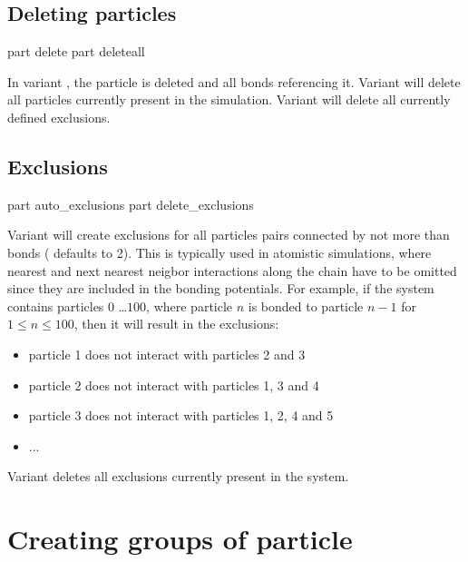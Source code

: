 \subsection{Deleting  particles}

\begin{essyntax}
   part  delete
   part deleteall
\end{essyntax}

In variant , the particle  is deleted
and all bonds referencing it.  Variant  will delete all
particles currently present in the simulation. Variant 
will delete all currently defined exclusions.

\subsection{Exclusions}

\begin{essyntax}
   part auto_exclusions 
   part delete_exclusions
\end{essyntax}

Variant  will create exclusions for all particles pairs
connected by not more than  bonds ( defaults to
2). This is typically used in atomistic simulations, where nearest and
next nearest neigbor interactions along the chain have to be omitted
since they are included in the bonding potentials. For example, if the
system contains particles $0$ \dots $100$, where particle $n$ is
bonded to particle $n-1$ for $1 \leq n \leq 100$, then it will result
in the exclusions:
\begin{itemize}
  \item particle 1 does not interact with particles 2 and 3
  \item particle 2 does not interact with particles 1, 3 and 4
  \item particle 3 does not interact with particles 1, 2, 4 and 5
  \item ...
\end{itemize}

Variant  deletes all exclusions currently present in the
system.

\section{Creating groups of particle}

